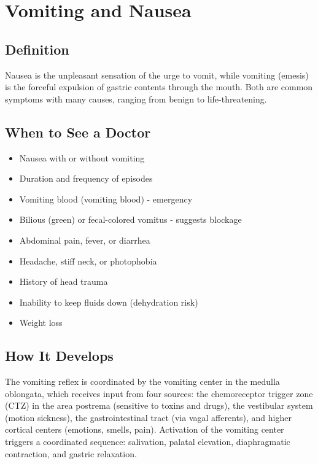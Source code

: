 \chapter{Vomiting and Nausea}

\section*{Definition}
Nausea is the unpleasant sensation of the urge to vomit, while vomiting (emesis) is the forceful expulsion of gastric contents through the mouth. Both are common symptoms with many causes, ranging from benign to life-threatening.

\section*{When to See a Doctor}
\begin{itemize}
\item Nausea with or without vomiting
\item Duration and frequency of episodes
\item Vomiting blood (vomiting blood) - emergency
\item Bilious (green) or fecal-colored vomitus - suggests blockage
\item Abdominal pain, fever, or diarrhea
\item Headache, stiff neck, or photophobia
\item History of head trauma
\item Inability to keep fluids down (dehydration risk)
\item Weight loss
\end{itemize}

\section*{How It Develops}
The vomiting reflex is coordinated by the vomiting center in the medulla oblongata, which receives input from four sources: the chemoreceptor trigger zone (CTZ) in the area postrema (sensitive to toxins and drugs), the vestibular system (motion sickness), the gastrointestinal tract (via vagal afferents), and higher cortical centers (emotions, smells, pain). Activation of the vomiting center triggers a coordinated sequence: salivation, palatal elevation, diaphragmatic contraction, and gastric relaxation.

